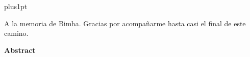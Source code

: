 \documentclass[12pt]{ucmthesis}  %
\theoremstyle{plain}
\theoremstyle{definition}
\theoremstyle{remark}
\theoremstyle{remark}
\begin{document}
\baselineskip=18pt plus1pt

\setcounter{secnumdepth}{3}
\setcounter{tocdepth}{3}



\begin{romanpages}          %

\begin{dedication}
  A la memoria de Bimba. Gracias por acompañarme hasta casi el final de este camino.
\end{dedication}

\begin{resumenlong}
  
  \begin{center}
  \vspace*{1cm}
  {\Large \bfseries  Abstract}
  \end{center}
  \vspace{0.3cm}
  
\end{resumenlong}


\tableofcontents            %
\end{romanpages}            %








%


\newpage
\printbibliography[title={References}]
\end{document}
